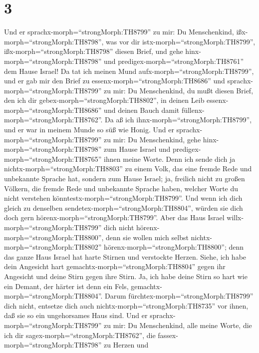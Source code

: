 \hypertarget{section-2}{%
\section{3}\label{section-2}}

 Und er sprachx-morph=``strongMorph:TH8799'' zu mir: Du
Menschenkind, ißx-morph=``strongMorph:TH8798'', was vor dir
istx-morph=``strongMorph:TH8799'', ißx-morph=``strongMorph:TH8798''
diesen Brief, und gehe hinx-morph=``strongMorph:TH8798'' und
predigex-morph=``strongMorph:TH8761'' dem Hause Israel!  Da
tat ich meinen Mund aufx-morph=``strongMorph:TH8799'', und er gab mir
den Brief zu essenx-morph=``strongMorph:TH8686''  und
sprachx-morph=``strongMorph:TH8799'' zu mir: Du Menschenkind, du mußt
diesen Brief, den ich dir gebex-morph=``strongMorph:TH8802'', in deinen
Leib essenx-morph=``strongMorph:TH8686'' und deinen Bauch damit
füllenx-morph=``strongMorph:TH8762''. Da aß ich
ihnx-morph=``strongMorph:TH8799'', und er war in meinem Munde so süß wie
Honig.  Und er sprachx-morph=``strongMorph:TH8799'' zu mir:
Du Menschenkind, gehe hinx-morph=``strongMorph:TH8798'' zum Hause Israel
und predigex-morph=``strongMorph:TH8765'' ihnen meine Worte.
 Denn ich sende dich ja nichtx-morph=``strongMorph:TH8803''
zu einem Volk, das eine fremde Rede und unbekannte Sprache hat, sondern
zum Hause Israel;  ja, freilich nicht zu großen Völkern, die
fremde Rede und unbekannte Sprache haben, welcher Worte du nicht
verstehen könntestx-morph=``strongMorph:TH8799''. Und wenn ich dich
gleich zu denselben sendetex-morph=``strongMorph:TH8804'', würden sie
dich doch gern hörenx-morph=``strongMorph:TH8799''.  Aber
das Haus Israel willx-morph=``strongMorph:TH8799'' dich nicht
hörenx-morph=``strongMorph:TH8800'', denn sie wollen mich selbst
nichtx-morph=``strongMorph:TH8802'' hörenx-morph=``strongMorph:TH8800'';
denn das ganze Haus Israel hat harte Stirnen und verstockte Herzen.
 Siehe, ich habe dein Angesicht hart
gemachtx-morph=``strongMorph:TH8804'' gegen ihr Angesicht und deine
Stirn gegen ihre Stirn.  Ja, ich habe deine Stirn so hart
wie ein Demant, der härter ist denn ein Fels,
gemachtx-morph=``strongMorph:TH8804''. Darum
fürchtex-morph=``strongMorph:TH8799'' dich nicht, entsetze dich auch
nichtx-morph=``strongMorph:TH8735'' vor ihnen, daß sie so ein
ungehorsames Haus sind.  Und er
sprachx-morph=``strongMorph:TH8799'' zu mir: Du Menschenkind, alle meine
Worte, die ich dir sagex-morph=``strongMorph:TH8762'', die
fassex-morph=``strongMorph:TH8798'' zu Herzen und
